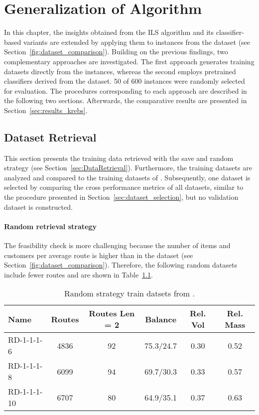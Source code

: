 
\chapter{Generalization of Algorithm}
\label{chap:application_krebs}


In this chapter, the insights obtained from the \gls{ILS} algorithm and its classifier-based variants are extended by
applying them to instances from the \krebsADataSetText dataset (see Section~\ref{fig:dataset_comparison}). Building on
the previous findings, two complementary approaches are investigated. The first approach generates training datasets
directly from the \krebsADataSetText instances, whereas the second employs pretrained classifiers derived from the
\gendreauDataSetText dataset. 50 of 600 instances were randomly selected for evaluation.
The procedures corresponding to each approach are described in the following two sections.
Afterwards, the comparative results are presented in Section~\ref{sec:results_krebs}.


\section{Dataset Retrieval}
\label{sec:krebs_data_retrieval}

This section presents the training data retrieved with the save and random strategy (see Section~\ref{sec:DataRetrieval}). Furthermore,
the training datasets are analyzed and compared to the training datasets of \gendreauDataSet. Subsequently, one dataset is selected by
comparing the cross performance metrics of all datasets, similar to the procedure presented in Section~\ref{sec:dataset_selection}, but no
validation dataset is constructed.

\subsubsection{Random retrieval strategy}
The feasibility check is more challenging because the number of items and customers per average route is higher than in the
\gendreauDataSetText dataset (see Section~\ref{fig:dataset_comparison}). Therefore, the following random datasets include fewer
routes and are shown in Table~\ref{tab:random_instances_krebs}.
\begin{table}[ht]
    \centering
    \small
    \begin{tabular}{l c c c c c }
        \toprule
        Name        & Routes & Routes Len = 2 & Balance   & Rel. Vol & Rel. Mass \\
        \midrule
        RD-1-1-1-6  & 4836   & 92             & 75.3/24.7 & 0.30     & 0.52      \\
        RD-1-1-1-8  & 6099   & 94             & 69.7/30.3 & 0.33     & 0.57      \\
        RD-1-1-1-10 & 6707   & 80             & 64.9/35.1 & 0.37     & 0.63      \\

        \bottomrule
    \end{tabular}
    \caption{Random strategy train datsets from \krebsADataSet.}
    \label{tab:random_instances_krebs}
\end{table}

